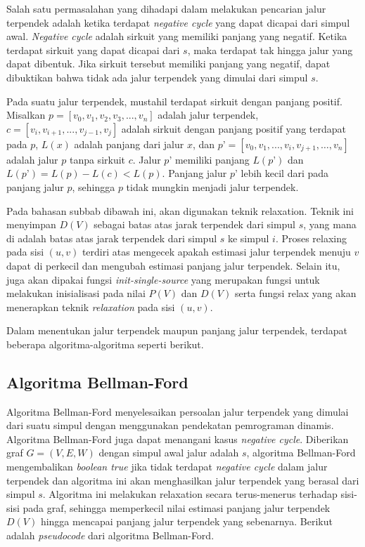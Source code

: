 \medskip


Salah satu permasalahan yang dihadapi dalam melakukan pencarian jalur terpendek adalah ketika terdapat \textit{negative cycle} yang dapat dicapai dari 
simpul awal. \textit{Negative cycle} adalah sirkuit yang memiliki panjang yang negatif. Ketika terdapat sirkuit yang dapat dicapai dari $s$, maka terdapat 
tak hingga jalur yang dapat dibentuk. Jika sirkuit tersebut memiliki panjang yang negatif, dapat dibuktikan bahwa tidak ada jalur terpendek 
yang dimulai dari simpul $s$.

Pada suatu jalur terpendek, mustahil terdapat sirkuit dengan  panjang positif. Misalkan $p = [v_{0}, v_{1}, v_{2}, v_{3}, ..., v_{n}]$ adalah jalur terpendek, 
$c = [v_{i}, v_{i+1}, ..., v_{j-1}, v_{j}]$ adalah sirkuit dengan panjang positif yang terdapat pada $p$, $L(x)$ adalah panjang dari jalur $x$, dan 
$p’ = [v_{0}, v_{1}, ..., v_{i}, v_{j+1}, …, v_{n}]$ adalah jalur $p$ tanpa sirkuit $c$. Jalur $p’$ memiliki panjang $L(p’)$ dan 
$L(p’) = L(p) - L(c) < L(p)$. Panjang jalur $p’$ lebih kecil dari pada panjang jalur $p$, sehingga $p$ tidak mungkin menjadi jalur terpendek.

Pada bahasan subbab dibawah ini, akan digunakan teknik relaxation. Teknik ini menyimpan $D(V)$ sebagai batas atas jarak terpendek dari simpul $s$, 
yang mana di adalah batas atas jarak terpendek dari simpul $s$ ke simpul $i$. Proses relaxing pada sisi $(u, v)$ terdiri atas mengecek apakah estimasi 
jalur terpendek menuju $v$ dapat di perkecil dan mengubah estimasi panjang jalur terpendek. Selain itu, juga akan dipakai fungsi \textit{init-single-source} 
yang merupakan fungsi untuk melakukan inisialisasi pada nilai $P(V)$ dan $D(V)$ serta fungsi relax yang akan menerapkan teknik \textit{relaxation} pada sisi $(u,v)$.

\medskip


\medskip


Dalam menentukan jalur terpendek maupun panjang jalur terpendek, terdapat beberapa algoritma-algoritma seperti berikut.

    \subsection{Algoritma Bellman-Ford}
        Algoritma Bellman-Ford menyelesaikan persoalan jalur terpendek yang dimulai dari suatu simpul dengan menggunakan pendekatan pemrograman dinamis. 
        Algoritma Bellman-Ford juga dapat menangani kasus \textit{negative cycle}. Diberikan 
        graf $G = (V, E, W)$ dengan simpul awal jalur adalah $s$, algoritma Bellman-Ford mengembalikan \textit{boolean true} jika tidak terdapat \textit{negative cycle} dalam 
        jalur terpendek dan algoritma ini akan menghasilkan jalur terpendek yang berasal dari simpul $s$. Algoritma ini melakukan \textit{}{relaxation} secara terus-menerus 
        terhadap sisi-sisi pada graf, sehingga memperkecil nilai estimasi panjang jalur terpendek $D(V)$ hingga mencapai panjang jalur terpendek yang sebenarnya. 
        Berikut adalah \textit{pseudocode} dari algoritma Bellman-Ford.

